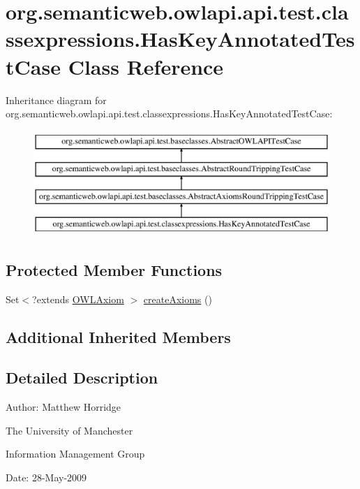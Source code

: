 \hypertarget{classorg_1_1semanticweb_1_1owlapi_1_1api_1_1test_1_1classexpressions_1_1_has_key_annotated_test_case}{\section{org.\-semanticweb.\-owlapi.\-api.\-test.\-classexpressions.\-Has\-Key\-Annotated\-Test\-Case Class Reference}
\label{classorg_1_1semanticweb_1_1owlapi_1_1api_1_1test_1_1classexpressions_1_1_has_key_annotated_test_case}
}
Inheritance diagram for org.\-semanticweb.\-owlapi.\-api.\-test.\-classexpressions.\-Has\-Key\-Annotated\-Test\-Case\-:\begin{figure}[H]
\begin{center}
\leavevmode
\includegraphics[height=4.000000cm]{classorg_1_1semanticweb_1_1owlapi_1_1api_1_1test_1_1classexpressions_1_1_has_key_annotated_test_case}
\end{center}
\end{figure}
\subsection*{Protected Member Functions}
\begin{DoxyCompactItemize}
\item 
Set$<$?extends \hyperlink{interfaceorg_1_1semanticweb_1_1owlapi_1_1model_1_1_o_w_l_axiom}{O\-W\-L\-Axiom} $>$ \hyperlink{classorg_1_1semanticweb_1_1owlapi_1_1api_1_1test_1_1classexpressions_1_1_has_key_annotated_test_case_a084799ea3aa27a6d06855dcfc3d3652b}{create\-Axioms} ()
\end{DoxyCompactItemize}
\subsection*{Additional Inherited Members}


\subsection{Detailed Description}
Author\-: Matthew Horridge\par
 The University of Manchester\par
 Information Management Group\par
 Date\-: 28-\/\-May-\/2009 

